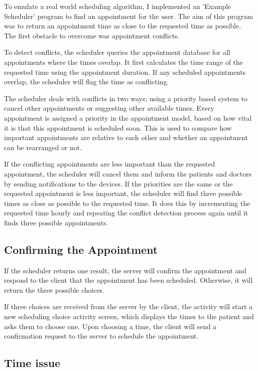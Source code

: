 To emulate a real world scheduling algorithm, I implemented an 'Example Scheduler' program to find an appointment for the user. The aim of this program was to return an appointment time as close to the requested time as possible. The first obstacle to overcome was appointment conflicts.

To detect conflicts, the scheduler queries the appointment database for all appointments where the times overlap. It first calculates the time range of the requested time using the appointment duration. If any scheduled appointments overlap, the scheduler will flag the time as conflicting. 

The scheduler deals with conflicts in two ways; using a priority based system to cancel other appointments or suggesting other available times. Every appointment is assigned a priority in the appointment model, based on how vital it is that this appointment is scheduled soon. This is used to compare how important appointments are relative to each other and whether an appointment can be rearranged or not.

If the conflicting appointments are less important than the requested appointment, the scheduler will cancel them and inform the patients and doctors by sending notifications to the devices. If the priorities are the same or the requested appointment is less important, the scheduler will find three possible times as close as possible to the requested time. It does this by incrementing the requested time hourly and repeating the conflict detection process again until it finds three possible appointments.

\subsection{Confirming the Appointment}

If the scheduler returns one result, the server will confirm the appointment and respond to the client that the appointment has been scheduled. Otherwise, it will return the three possible choices.

If three choices are received from the server by the client, the activity will start a new scheduling choice activity screen, which displays the times to the patient and asks them to choose one. Upon choosing a time, the client will send a confirmation request to the server to schedule the appointment.

\subsection{Time issue}

